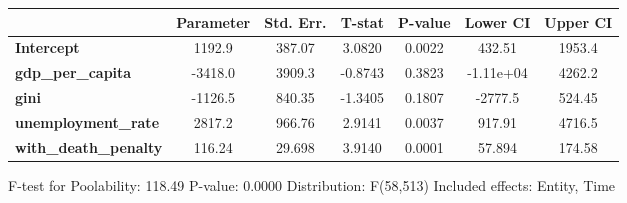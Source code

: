 \begin{center}
\begin{tabular}{lclc}
\bottomrule
\end{tabular}
\begin{tabular}{lcccccc}
                              & \textbf{Parameter} & \textbf{Std. Err.} & \textbf{T-stat} & \textbf{P-value} & \textbf{Lower CI} & \textbf{Upper CI}  \\
\midrule
\textbf{Intercept}            &       1192.9       &       387.07       &      3.0820     &      0.0022      &       432.51      &       1953.4       \\
\textbf{gdp\_per\_capita}     &      -3418.0       &       3909.3       &     -0.8743     &      0.3823      &     -1.11e+04     &       4262.2       \\
\textbf{gini}                 &      -1126.5       &       840.35       &     -1.3405     &      0.1807      &      -2777.5      &       524.45       \\
\textbf{unemployment\_rate}   &       2817.2       &       966.76       &      2.9141     &      0.0037      &       917.91      &       4716.5       \\
\textbf{with\_death\_penalty} &       116.24       &       29.698       &      3.9140     &      0.0001      &       57.894      &       174.58       \\
\bottomrule
\end{tabular}
\end{center}

F-test for Poolability: 118.49 \newline
 P-value: 0.0000 \newline
 Distribution: F(58,513) \newline
  \newline
 Included effects: Entity, Time